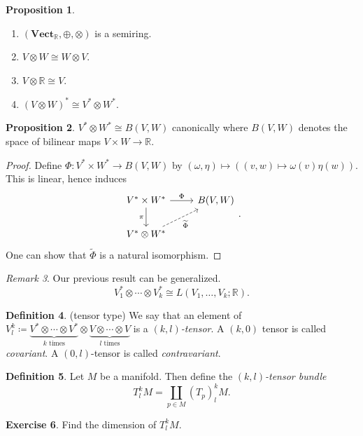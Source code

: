 \documentclass[10pt,letterpaper,cm]{nupset}
\theoremstyle{definition}
\newtheorem{definition}{Definition}[subsection]
\theoremstyle{theorem}
\newtheorem{prop}[definition]{Proposition}
\newtheorem{exercise}[definition]{Exercise}
\theoremstyle{remark}
\newtheorem{remark}[definition]{Remark}
\newcommand{\R}{\mathbb R}
\newcommand{\1}{\mathbf{1}}
\newcommand{\0}{\vec 0}
\begin{document}
\begin{prop} $ $
\begin{enumerate}
\item $(\mathbf{Vect}_{\R}, \oplus, \otimes)$ is a semiring. 
\item $V \otimes W \cong W \otimes V$.
\item $V \otimes \R \cong V$.
\item $(V \otimes W)^{\ast} \cong V^{\ast} \otimes W^{\ast}$.
\end{enumerate}
\end{prop}

\begin{prop}
$V^{\ast} \otimes W^{\ast} \cong B(V, W)$ canonically where $B(V, W)$ denotes the space of bilinear maps $V \times W \to \R$.
\end{prop}
\begin{proof}
Define $\Phi : V^{\ast} \times W^{\ast} \to B(V, W)$ by $(\omega, \eta) \mapsto ((v, w) \mapsto \omega(v) \eta(w))$.
This is linear, hence induces
\[
\begin{tikzcd}
V^{\ast}\times W^{\ast} \arrow[d, "\pi"'] \arrow[r, "\Phi"] & {B(V, W)} \\
V^{\ast} \otimes W^{\ast} \arrow[ru, "{\widetilde{\Phi}}"', dashed] & 
\end{tikzcd} .
\]
One can show that $\tilde{\Phi}$ is a natural isomorphism.
\end{proof}

\begin{remark}
Our previous result can be generalized. $$V_1^{\ast} \otimes \cdots \otimes V_k^{\ast} \cong L(V_1, \ldots, V_k; \R). $$
\end{remark}

\begin{definition}{(tensor type)}
We say that an element of $V_l^k\coloneqq  \underbrace{V^{\ast} \otimes \cdots \otimes V^{\ast}}_{k \text{ times}} \otimes \underbrace{V \otimes \cdots \otimes V}_{l \text{ times}}$ is a \textit{$(k, l)$-tensor}. A $(k, 0)$ tensor is called \textit{covariant}. A $(0, l)$-tensor is called \textit{contravariant}.
\end{definition}

\begin{definition}
Let $M$ be a manifold. Then define the \textit{$(k, l)$-tensor bundle} $$T _l^k M = \coprod_{p\in M} (T_p)_l^k M.$$
\end{definition}

\begin{exercise}
Find the dimension of $T_l^k M$.
\end{exercise}
\end{document}
